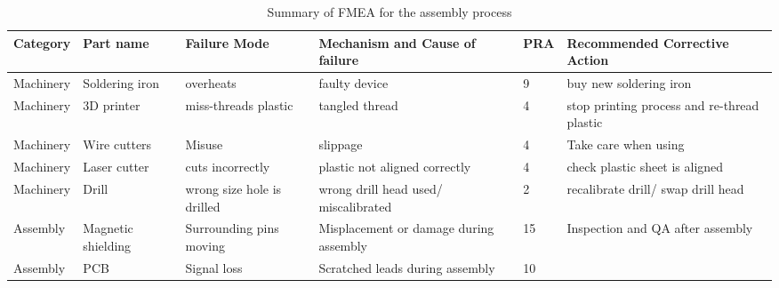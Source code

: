\begin{table}[ht]
    \centering
    \begin{tabular}{b{1.7cm} b{1.5cm} b{2cm} b{3.5cm} l b{4.2cm}}
        \textbf{Category} & \textbf{Part name} & \textbf{Failure Mode} & \textbf{Mechanism and Cause of failure} & \textbf{PRA} & \textbf{Recommended Corrective Action} \\ \hline
        Machinery & Soldering iron & overheats & faulty device & 9 & buy new soldering iron  \\ 
        Machinery & 3D printer  & miss-threads plastic & tangled thread & 4 & stop printing process and re-thread plastic \\ 
        Machinery & Wire cutters  & Misuse & slippage  & 4 & Take care when using \\ 
        Machinery & Laser cutter & cuts incorrectly & plastic not aligned correctly & 4 & check plastic sheet is aligned  \\ 
        Machinery & Drill & wrong size hole is drilled & wrong drill head used/ miscalibrated  & 2 & recalibrate drill/ swap drill head \\ 
        Assembly & Magnetic shielding & Surrounding pins moving & Misplacement or damage during assembly & 15 & Inspection and QA after assembly \\ 
        Assembly & PCB & Signal loss & Scratched leads during assembly & 10 & ~\\ \hline
    \end{tabular}
    \caption[]{Summary of FMEA for the assembly process}
    \label{tb:FMEA-assembly}
\end{table}

